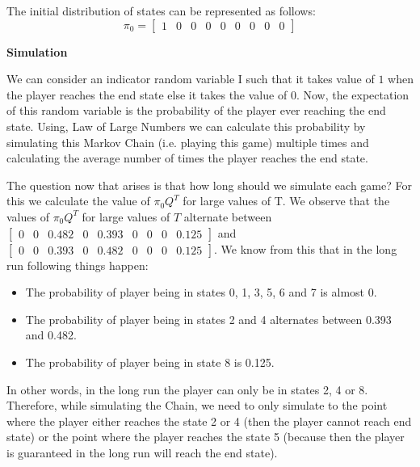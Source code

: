 \documentclass{article}
\begin{document}
\begin{enumerate}
        The initial distribution of states can be represented as follows:
        \begin{equation}
        \nonumber
            \pi_{0} = \begin{bmatrix}
                       1 & 0 & 0 & 0 & 0 & 0 & 0 & 0 & 0
                      \end{bmatrix}
        \end{equation}

        \textbf{Simulation} \par
	
	    \noindent %
        We can consider an indicator random variable I such that it takes value of $1$ when the player reaches the end state else it
        takes the value of $0$. Now, the expectation of this random variable is the probability of the player ever reaching the end state.
        Using, Law of Large Numbers we can calculate this probability by simulating this Markov Chain (i.e. playing this game) multiple
        times and calculating the average number of times the player reaches the end state.\par
	
	    \noindent %
        The question now that arises is that how long should we simulate each game? For this we calculate the value of $\pi_{0}Q^{T}$ for
        large values of T. We observe that the values of $\pi_{0}Q^{T}$ for large values of $T$ alternate between $\begin{bmatrix} 0 & 0 & 0.482 & 0 & 0.393 & 0 & 0 &
        0 & 0.125 \end{bmatrix}$ and \\ $\begin{bmatrix} 0 & 0 & 0.393 & 0 & 0.482 & 0 & 0 & 0 & 0.125 \end{bmatrix}$. We know 
        from this that in the long run following things happen:
        \begin{itemize}
            \item The probability of player being in states 0, 1, 3, 5, 6 and 7 is almost 0.
            \item The probability of player being in states 2 and 4 alternates between 0.393 and 0.482.
            \item The probability of player being in state 8 is 0.125.
        \end{itemize}
        In other words, in the long run the player can only be in states 2, 4 or 8. Therefore, while simulating the Chain, we need to 
        only simulate to the point where the player either reaches the state 2 or 4 (then the player cannot reach end state) or the 
        point where the player reaches the state 5 (because then the player is guaranteed in the long run will reach the end state). \par
	

\end{enumerate}
\end{document}
